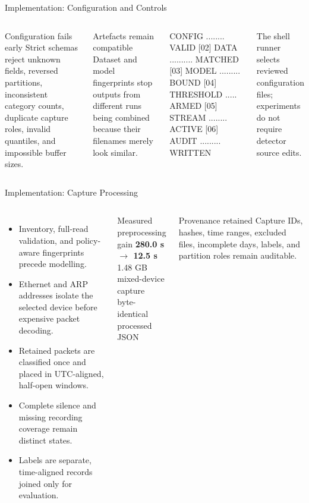 \documentclass[aspectratio=169,10pt]{beamer}
\begin{document}
\begin{frame}[fragile]{Implementation: Configuration and Controls}
\begin{columns}[T,onlytextwidth]
\begin{exampleblock}{Configuration fails early}
Strict schemas reject unknown fields, reversed partitions, inconsistent category
counts, duplicate capture roles, invalid quantiles, and impossible buffer sizes.
\end{exampleblock}

\begin{block}{Artefacts remain compatible}
Dataset and model fingerprints stop outputs from different runs being combined
because their filenames merely look similar.
\end{block}

\begin{asciiart}
[01] CONFIG ........ VALID
[02] DATA .......... MATCHED
[03] MODEL ......... BOUND
[04] THRESHOLD ..... ARMED
[05] STREAM ........ ACTIVE
[06] AUDIT ......... WRITTEN
\end{asciiart}

\vspace{0.3cm}
\small The shell runner selects reviewed configuration files; experiments do
not require detector source edits.
\end{columns}
\end{frame}

\begin{frame}{Implementation: Capture Processing}
\begin{columns}[T,onlytextwidth]
\begin{itemize}
  \item Inventory, full-read validation, and policy-aware fingerprints precede
  modelling.
  \item Ethernet and ARP addresses isolate the selected device before expensive
  packet decoding.
  \item Retained packets are classified once and placed in UTC-aligned,
  half-open windows.
  \item Complete silence and missing recording coverage remain distinct states.
  \item Labels are separate, time-aligned records joined only for evaluation.
\end{itemize}

\begin{exampleblock}{Measured preprocessing gain}
\centering
\Huge\textbf{280.0 s $\rightarrow$ 12.5 s}\\[0.15cm]
\small 1.48 GB mixed-device capture\\
byte-identical processed JSON
\end{exampleblock}

\begin{alertblock}{Provenance retained}
Capture IDs, hashes, time ranges, excluded files, incomplete days, labels, and
partition roles remain auditable.
\end{alertblock}
\end{columns}
\end{frame}
\end{document}
